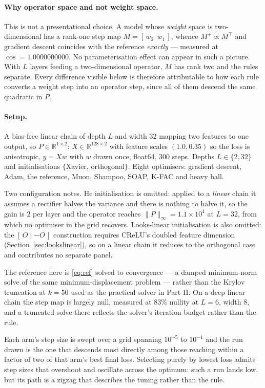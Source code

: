 \documentclass{article} %
\theoremstyle{plain}
\theoremstyle{definition}
\theoremstyle{remark}
\begin{document}
\paragraph{Why operator space and not weight space.}
This is not a presentational choice. A model whose \emph{weight} space is two-dimensional has a
rank-one step map $M = [\,w_2\ \ w_1\,]$, whence $M^{+} \propto M^\top$ and gradient descent
coincides with the reference \emph{exactly} --- measured at $\cos = 1.0000000000$. No
parameterisation effect can appear in such a picture. With $L$ layers feeding a two-dimensional
operator, $M$ has rank two and the rules separate. Every difference visible below is therefore
attributable to how each rule converts a weight step into an operator step, since all of them
descend the same quadratic in $P$.

\paragraph{Setup.}
A bias-free linear chain of depth $L$ and width $32$ mapping two features to one output, so
$P \in \mathbb{R}^{1\times2}$: $X \in \mathbb{R}^{128 \times 2}$ with feature scales $(1.0, 0.35)$
so the loss is anisotropic, $y = Xw$ with $w$ drawn once, float64, $300$ steps. Depths
$L \in \{2, 32\}$ and initialisations $\{$Xavier, orthogonal$\}$. Eight optimisers: gradient
descent, Adam, the reference, Muon, Shampoo, SOAP, K-FAC and heavy ball.

Two configuration notes. He initialisation is omitted: applied to a \emph{linear} chain it assumes
a rectifier halves the variance and there is nothing to halve it, so the gain is $2$ per layer and
the operator reaches $\|P\|_\infty = 1.1\times10^{4}$ at $L=32$, from which no optimiser in the grid
recovers. Looks-linear initialisation is also omitted: the $[\,O \mid -O\,]$ construction requires
CReLU's doubled feature dimension (Section~\ref{sec:lookslinear}), so on a linear chain it reduces
to the orthogonal case and contributes no separate panel.

The reference here is \eqref{eq:ref} solved to convergence --- a damped minimum-norm solve of the
same minimum-displacement problem --- rather than the Krylov truncation at $k = 50$ used as the
practical solver in Part II. On a deep linear chain the step map is largely null, measured at $83\%$
nullity at $L=6$, width $8$, and a truncated solve there reflects the solver's iteration budget
rather than the rule.

Each arm's step size is swept over a grid spanning $10^{-5}$ to $10^{-1}$ and the run drawn is the
one that descends most directly among those reaching within a factor of two of that arm's best
final loss. Selecting purely by lowest loss admits step sizes that overshoot and oscillate across
the optimum: such a run lands low, but its path is a zigzag that describes the tuning rather than
the rule.
\end{document}
